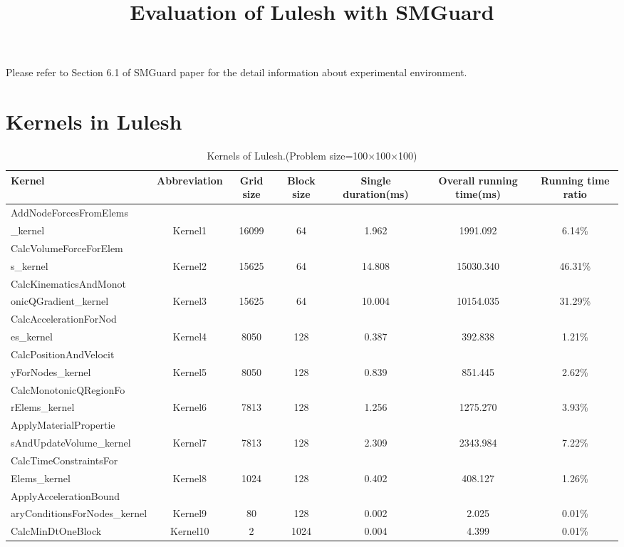 \documentclass[a4paper,9pt]{article}
\title{Evaluation of Lulesh with SMGuard}
\date{}
\begin{document}
 
\maketitle

Please refer to Section 6.1 of SMGuard paper for the detail information about experimental environment.

\section{Kernels in Lulesh}

\begin{table}[htbp]
	\centering
	\small
	\caption{Kernels of Lulesh.(Problem size=100$\times$100$\times$100)}
	\begin{tabular}{p{4cm}cccccc}
		\toprule
		Kernel & Abbreviation & \multicolumn{1}{p{1cm}}{Grid size} & \multicolumn{1}{p{1cm}}{Block size} & \multicolumn{1}{p{2cm}}{Single duration(ms)} & \multicolumn{1}{p{2cm}}{Overall running time(ms)} & \multicolumn{1}{p{2cm}}{Running time ratio} \\
		\midrule
		AddNodeForcesFromElems\\\_kernel & Kernel1 & 16099 & 64    & 1.962 & 1991.092 & 6.14\% \\
		\hline
		CalcVolumeForceForElem\\s\_kernel & Kernel2 & 15625 & 64    & 14.808 & 15030.340 & 46.31\% \\
		\hline
		CalcKinematicsAndMonot\\onicQGradient\_kernel & Kernel3 & 15625 & 64    & 10.004 & 10154.035 & 31.29\% \\
		\hline
		CalcAccelerationForNod\\es\_kernel & Kernel4 & 8050  & 128   & 0.387 & 392.838 & 1.21\% \\
		\hline
		CalcPositionAndVelocit\\yForNodes\_kernel & Kernel5 & 8050  & 128   & 0.839 & 851.445 & 2.62\% \\
		\hline	
		CalcMonotonicQRegionFo\\rElems\_kernel & Kernel6 & 7813  & 128   & 1.256 & 1275.270 & 3.93\% \\
		\hline
		ApplyMaterialPropertie\\sAndUpdateVolume\_kernel & Kernel7 & 7813  & 128   & 2.309 & 2343.984 & 7.22\% \\
		\hline
		CalcTimeConstraintsFor\\Elems\_kernel & Kernel8 & 1024  & 128   & 0.402 & 408.127 & 1.26\% \\
		\hline
		ApplyAccelerationBound\\aryConditionsForNodes\_kernel & Kernel9 & 80    & 128   & 0.002 & 2.025 & 0.01\% \\
		\hline
		CalcMinDtOneBlock & Kernel10 & 2     & 1024  & 0.004 & 4.399 & 0.01\% \\
		\bottomrule
	\end{tabular}%
	\label{tab:kernels}%
\end{table}%
\end{document}
